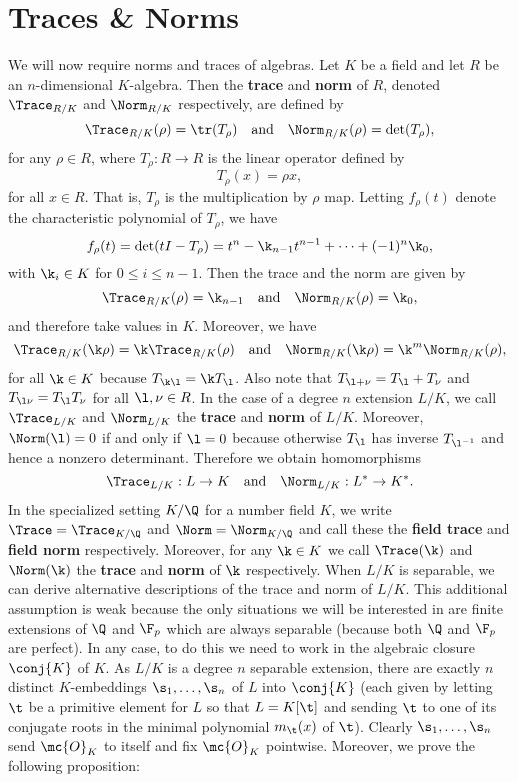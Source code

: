   \section{Traces \& Norms}
    We will now require norms and traces of algebras. Let $K$ be a field and let $R$ be an $n$-dimensional $K$-algebra. Then the \textbf{trace} and \textbf{norm} of $R$, denoted $\Trace_{R/K}$ and $\Norm_{R/K}$ respectively, are defined by
    \[
      \Trace_{R/K}(\rho) = \tr(T_{\rho}) \quad \text{and} \quad \Norm_{R/K}(\rho) = \det(T_{\rho}),
    \]
    for any $\rho \in R$, where $T_{\rho}:R \to R$ is the linear operator defined by
    \[
      T_{\rho}(x) = \rho x,
    \]
    for all $x \in R$. That is, $T_{\rho}$ is the multiplication by $\rho$ map. Letting $f_{\rho}(t)$ denote the characteristic polynomial of $T_{\rho}$, we have
    \[
      f_{\rho}(t) = \det(tI-T_{\rho}) = t^{n}-\k_{n-1}t^{n-1}+\cdots+(-1)^{n}\k_{0},
    \]
    with $\k_{i} \in K$ for $0 \le i \le n-1$. Then the trace and the norm are given by
    \begin{equation}\label{equ:trace_and_norm_characteristic_polynomial}
      \Trace_{R/K}(\rho) = \k_{n-1} \quad \text{and} \quad \Norm_{R/K}(\rho) = \k_{0},
    \end{equation}
    and therefore take values in $K$. Moreover, we have
    \[
      \Trace_{R/K}(\k\rho) = \k\Trace_{R/K}(\rho) \quad \text{and} \quad \Norm_{R/K}(\k\rho) = \k^{m}\Norm_{R/K}(\rho),
    \]
    for all $\k \in K$ because $T_{\k\l} = \k T_{\l}$. Also note that $T_{\l+\nu} = T_{\l}+T_{\nu}$ and $T_{\l \nu} = T_{\l}T_{\nu}$ for all $\l,\nu \in R$. In the case of a degree $n$ extension $L/K$, we call $\Trace_{L/K}$ and $\Norm_{L/K}$ the \textbf{trace} and \textbf{norm} of $L/K$. Moreover, $\Norm(\l) = 0$ if and only if $\l = 0$ because otherwise $T_{\l}$ has inverse $T_{\l^{-1}}$ and hence a nonzero determinant. Therefore we obtain homomorphisms
    \[
      \Trace_{L/K}:L \to K \quad \text{and} \quad \Norm_{L/K}:L^{\ast} \to K^{\ast}.
    \]
    In the specialized setting $K/\Q$ for a number field $K$, we write $\Trace = \Trace_{K/\Q}$ and $\Norm = \Norm_{K/\Q}$ and call these the \textbf{field trace} and \textbf{field norm} respectively. Moreover, for any $\k \in K$ we call $\Trace(\k)$ and $\Norm(\k)$ the \textbf{trace} and \textbf{norm} of $\k$ respectively. When $L/K$ is separable, we can derive alternative descriptions of the trace and norm of $L/K$. This additional assumption is weak because the only situations we will be interested in are finite extensions of $\Q$ and $\F_{p}$ which are always separable (because both $\Q$ and $\F_{p}$ are perfect). In any case, to do this we need to work in the algebraic closure $\conj{K}$ of $K$. As $L/K$ is a degree $n$ separable extension, there are exactly $n$ distinct $K$-embeddings $\s_{1},\ldots,\s_{n}$ of $L$ into $\conj{K}$ (each given by letting $\t$ be a primitive element for $L$ so that $L = K[\t]$ and sending $\t$ to one of its conjugate roots in the minimal polynomial $m_{\t}(x)$ of $\t$). Clearly $\s_{1},\ldots,\s_{n}$ send $\mc{O}_{K}$ to itself and fix $\mc{O}_{K}$ pointwise. Moreover, we prove the following proposition:

